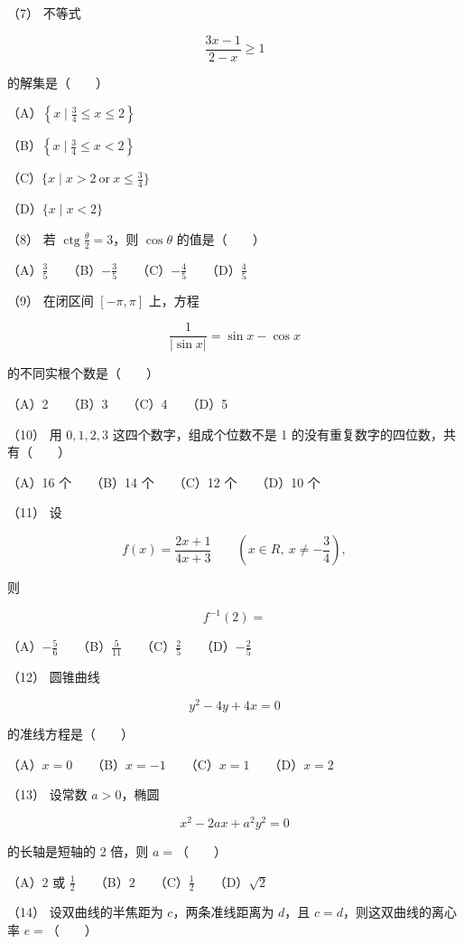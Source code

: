 \begin{question}
（7） 不等式

\nopagebreak[4]
\[
\frac{3x-1}{2-x}\geq1
\]

的解集是\mbox{（　　）}

（A）$\left\{x\mid\frac34\leq x\leq2\right\}$

（B）$\left\{x\mid\frac34\leq x<2\right\}$

（C）$\{x\mid x>2\ \mathrm{or}\ x\leq\frac34\}$

（D）$\{x\mid x<2\}$

（8） 若 $\operatorname{ctg}\frac\theta2=3$，则 $\cos\theta$ 的值是\mbox{（　　）}

（A）$\frac35$　　（B）$-\frac35$　　（C）$-\frac45$　　（D）$\frac45$

（9） 在闭区间 $[-\pi,\pi]$ 上，方程

\nopagebreak[4]
\[
\frac1{|\sin x|}=\sin x-\cos x
\]

的不同实根个数是\mbox{（　　）}

（A）2　　（B）3　　（C）4　　（D）5

（10） 用 $0,1,2,3$ 这四个数字，组成个位数不是 1 的没有重复数字的四位数，共有\mbox{（　　）}

（A）16 个　　（B）14 个　　（C）12 个　　（D）10 个

（11） 设

\nopagebreak[4]
\[
f(x)=\frac{2x+1}{4x+3}\qquad(x\in R,\ x\ne-\frac34),
\]

则

\nopagebreak[4]
\[
f^{-1}(2)=
\]

（A）$-\frac56$　　（B）$\frac5{11}$　　（C）$\frac25$　　（D）$-\frac25$

（12） 圆锥曲线

\nopagebreak[4]
\[
y^2-4y+4x=0
\]

的准线方程是\mbox{（　　）}

（A）$x=0$　　（B）$x=-1$　　（C）$x=1$　　（D）$x=2$

（13） 设常数 $a>0$，椭圆

\nopagebreak[4]
\[
x^2-2ax+a^2y^2=0
\]

的长轴是短轴的 2 倍，则 $a=$\mbox{（　　）}

（A）$2$ 或 $\frac12$　　（B）$2$　　（C）$\frac12$　　（D）$\sqrt2$

（14） 设双曲线的半焦距为 $c$，两条准线距离为 $d$，且 $c=d$，则这双曲线的离心率 $e=$\mbox{（　　）}


\end{question}
